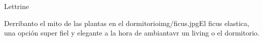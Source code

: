 \documentclass[10pt]{article}
\begin{document}


\begin{article*}

\lettrine{L}{}ettrine \lipsum[2]


\lipsum[2-5]
\end{article*}


\begin{accented_article_figure}{Derribanto el mito de las plantas en el dormitorio}{img/ficus.jpg}{El ficus elastica, una opción super fiel y elegante a la hora de ambiantavr un living o el dormitorio.}
\lipsum[1-2]
\end{accented_article_figure}


\end{document}
